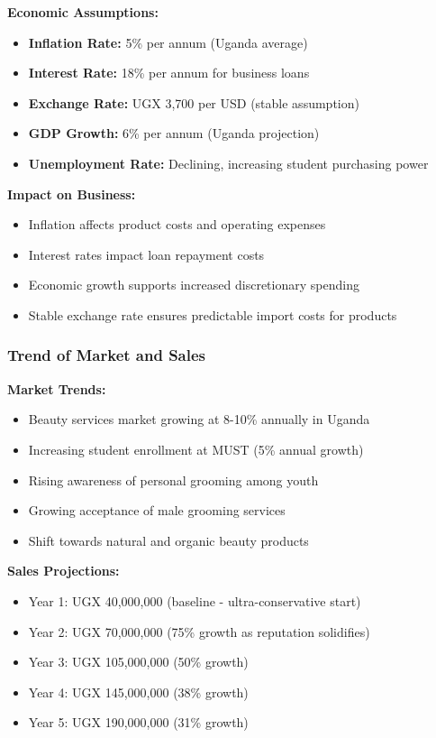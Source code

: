 \textbf{Economic Assumptions:}
\begin{itemize}[leftmargin=2em]
    \item \textbf{Inflation Rate:} 5\% per annum (Uganda average)
    \item \textbf{Interest Rate:} 18\% per annum for business loans
    \item \textbf{Exchange Rate:} UGX 3,700 per USD (stable assumption)
    \item \textbf{GDP Growth:} 6\% per annum (Uganda projection)
    \item \textbf{Unemployment Rate:} Declining, increasing student purchasing power
\end{itemize}

\textbf{Impact on Business:}
\begin{itemize}[leftmargin=2em]
    \item Inflation affects product costs and operating expenses
    \item Interest rates impact loan repayment costs
    \item Economic growth supports increased discretionary spending
    \item Stable exchange rate ensures predictable import costs for products
\end{itemize}

\subsubsection{Trend of Market and Sales}

\textbf{Market Trends:}
\begin{itemize}[leftmargin=2em]
    \item Beauty services market growing at 8-10\% annually in Uganda
    \item Increasing student enrollment at MUST (5\% annual growth)
    \item Rising awareness of personal grooming among youth
    \item Growing acceptance of male grooming services
    \item Shift towards natural and organic beauty products
\end{itemize}

\textbf{Sales Projections:}
\begin{itemize}[leftmargin=2em]
    \item Year 1: UGX 40,000,000 (baseline - ultra-conservative start)
    \item Year 2: UGX 70,000,000 (75\% growth as reputation solidifies)
    \item Year 3: UGX 105,000,000 (50\% growth)
    \item Year 4: UGX 145,000,000 (38\% growth)
    \item Year 5: UGX 190,000,000 (31\% growth)
\end{itemize}

